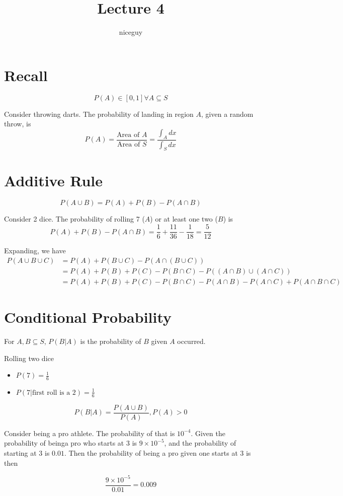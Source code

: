 \documentclass[12pt]{article}
\author{niceguy}
\title{Lecture 4}
\begin{document}
\maketitle

\section{Recall}

$$P(A)\in[0,1]\forall A\subseteq S$$

\begin{ex}
	Consider throwing darts. The probability of landing in region $A$, given a random throw, is
	$$P(A) = \frac{\text{Area of }A}{\text{Area of }S} = \frac{\int_Adx}{\int_Sdx}$$
\end{ex}

\section{Additive Rule}

$$P(A\cup B) = P(A) + P(B) - P(A\cap B)$$

\begin{ex}
	Consider 2 dice. The probability of rolling 7 ($A$) or at least one two ($B$) is
	$$P(A) + P(B) - P(A\cap B) = \frac{1}{6} + \frac{11}{36} - \frac{1}{18} = \frac{5}{12}$$
\end{ex}

Expanding, we have
\begin{align*}
	P(A\cup B\cup C) &= P(A) + P(B\cup C) - P(A\cap(B\cup C)) \\
			 &= P(A) + P(B) + P(C) - P(B\cap C) - P((A\cap B)\cup(A\cap C)) \\
			 &= P(A) + P(B) + P(C) - P(B\cap C) - P(A\cap B) - P(A\cap C) + P(A\cap B\cap C)
\end{align*}

\section{Conditional Probability}

For $A,B\subseteq S$, $P(B|A)$ is the probability of $B$ given $A$ occurred.

\begin{ex}
	Rolling two dice
	\begin{itemize}
		\item $P(7) = \frac{1}{6}$
		\item $P(7|\text{first roll is a 2}) = \frac{1}{6}$
	\end{itemize}
\end{ex}

\begin{defn}
	$$P(B|A) = \frac{P(A\cup B)}{P(A)}, P(A) > 0$$
\end{defn}

Consider being a pro athlete. The probability of that is $10^{-4}$. Given the probability of beinga pro who starts at 3 is $9\times10^{-5}$, and the probability of starting at 3 is $0.01$. Then the probability of being a pro given one starts at 3 is then

$$\frac{9\times10^{-5}}{0.01} = 0.009$$
\end{document}

